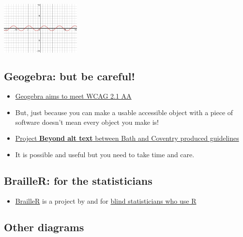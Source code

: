 \documentclass[
  12pt,
  a4paper]{extarticle}
\providecommand{\tightlist}{%
  \setlength{\itemsep}{0pt}\setlength{\parskip}{0pt}}
\theoremstyle{plain}
\theoremstyle{plain}
\theoremstyle{plain}
\theoremstyle{plain}
\theoremstyle{plain}
\theoremstyle{definition}
\theoremstyle{definition}
\theoremstyle{definition}
\theoremstyle{remark}
\renewcommand{\;}{\,}
\begin{document}
\includegraphics[width=0.3\textwidth,height=\textheight]{./Figs/desmos-sine-graph.png}

\hypertarget{geogebra-but-be-careful}{%
\subsection{Geogebra: but be careful!}\label{geogebra-but-be-careful}}

\begin{itemize}
\tightlist
\item
  \href{https://www.geogebra.org/m/r2EF8uRx}{Geogebra aims to meet WCAG 2.1 AA}
\item
  But, just because you can make a usable accessible object with a piece of software doesn't mean every object you make is!
\item
  \href{https://bathmash.github.io/CETL-MSOR-2022-Beyond-alt-text/index.html}{Project \textbf{Beyond alt text} between Bath and Coventry produced guidelines}
\item
  It is possible and useful but you need to take time and care.
\end{itemize}

\hypertarget{brailler-for-the-statisticians}{%
\subsection{BrailleR: for the statisticians}\label{brailler-for-the-statisticians}}

\begin{itemize}
\tightlist
\item
  \href{https://github.com/ajrgodfrey/BrailleR}{BrailleR} is a project by and for \href{https://r-resources.massey.ac.nz/BrailleR/}{blind statisticians who use R}
\end{itemize}

\hypertarget{other-diagrams}{%
\subsection{Other diagrams}\label{other-diagrams}}
\end{document}
